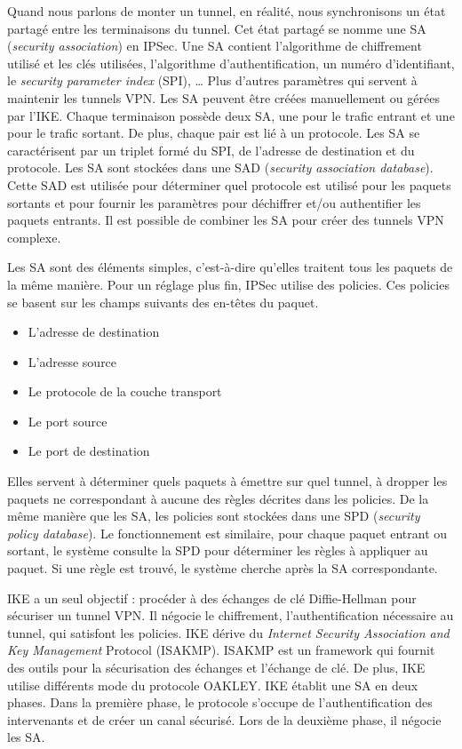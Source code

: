 Quand nous parlons de monter un tunnel, en réalité, nous synchronisons un état partagé entre les terminaisons du tunnel. 
Cet état partagé se nomme une SA (\textit{security association}) en IPSec. 
Une SA contient l'algorithme de chiffrement utilisé et les clés utilisées, l'algorithme d'authentification, un numéro d'identifiant, le \textit{security parameter index} (SPI), … 
Plus d'autres paramètres qui servent à maintenir les tunnels VPN. 
Les SA peuvent être créées manuellement ou gérées par l'IKE. 
Chaque terminaison possède deux SA, une pour le trafic entrant et une pour le trafic sortant. 
De plus, chaque pair est lié à un protocole. 
Les SA se caractérisent par un triplet formé du SPI, de l'adresse de destination et du protocole. 
Les SA sont stockées dans une SAD (\textit{security association database}). 
Cette SAD est utilisée pour déterminer quel protocole est utilisé pour les paquets sortants et pour fournir les paramètres pour déchiffrer et/ou authentifier les paquets entrants. 
Il est possible de combiner les SA pour créer des tunnels VPN complexe. 

Les SA sont des éléments simples, c'est-à-dire qu'elles traitent tous les paquets de la même manière. 
Pour un réglage plus fin, IPSec utilise des policies. 
Ces policies se basent sur les champs suivants des en-têtes du paquet.
\begin{itemize}
\item L'adresse de destination
\item L'adresse source
\item Le protocole de la couche transport
\item Le port source
\item Le port de destination
\end{itemize}
Elles servent à déterminer quels paquets à émettre sur quel tunnel, à dropper les paquets ne correspondant à aucune des règles décrites dans les policies. 
De la même manière que les SA, les policies sont stockées dans une SPD (\textit{security policy database}). 
Le fonctionnement est similaire, pour chaque paquet entrant ou sortant, le système consulte la SPD pour déterminer les règles à appliquer au paquet. Si une règle est trouvé, le système cherche après la SA correspondante.

IKE a un seul objectif : procéder à des échanges de clé Diffie-Hellman pour sécuriser un tunnel VPN. 
Il négocie le chiffrement, l'authentification nécessaire au tunnel, qui satisfont les policies. 
IKE dérive du \textit{Internet Security Association and Key Management} Protocol (ISAKMP). 
ISAKMP est un framework qui fournit des outils pour la sécurisation des échanges et l'échange de clé. 
De plus, IKE utilise différents mode du protocole OAKLEY.
IKE établit une SA en deux phases. 
Dans la première phase, le protocole s'occupe de l'authentification des intervenants et de créer un canal sécurisé. Lors de la deuxième phase, il négocie les SA. 

